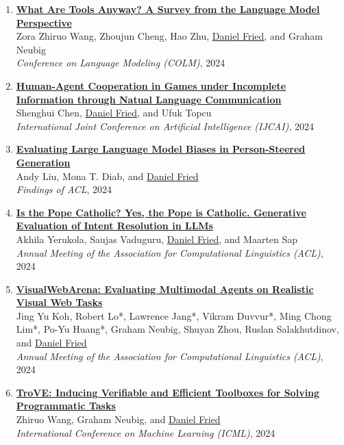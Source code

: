 \begin{enumerate}[leftmargin=-1mm,partopsep=0pt]
\item \href{http://arxiv.org/abs/2403.15452}{\textbf{What Are Tools Anyway? A Survey from the Language Model Perspective}} \\
  Zora Zhiruo Wang, Zhoujun Cheng, Hao Zhu, \underline{Daniel Fried}, and Graham Neubig\\
  \emph{Conference on Language Modeling (COLM)}, 2024

\item \href{https://arxiv.org/abs/2405.14173}{\textbf{Human-Agent Cooperation in Games under Incomplete Information through Natual Language Communication }} \\
  Shenghui Chen, \underline{Daniel Fried}, and Ufuk Topcu\\
  \emph{International Joint Conference on Artificial Intelligence (IJCAI)}, 2024

\item \href{https://arxiv.org/abs/2405.20253}{\textbf{Evaluating Large Language Model Biases in Person-Steered Generation}} \\
  Andy Liu, Mona T. Diab, and \underline{Daniel Fried}\\
  \emph{Findings of ACL}, 2024

\item \href{https://arxiv.org/abs/2405.08760}{\textbf{Is the Pope Catholic? Yes, the Pope is Catholic. Generative Evaluation of Intent Resolution in LLMs}} \\
  Akhila Yerukola, Saujas Vaduguru, \underline{Daniel Fried}, and Maarten Sap\\
  \emph{Annual Meeting of the Association for Computational Linguistics (ACL)}, 2024

\item \href{https://arxiv.org/abs/2401.13649}{\textbf{VisualWebArena: Evaluating Multimodal Agents on Realistic Visual Web Tasks}} \\
  Jing Yu Koh, Robert Lo*, Lawrence Jang*, Vikram Duvvur*, Ming Chong Lim*, Po-Yu Huang*, Graham Neubig, Shuyan Zhou, Ruslan Salakhutdinov, and \underline{Daniel Fried}\\
  \emph{Annual Meeting of the Association for Computational Linguistics (ACL)}, 2024

\item \href{https://arxiv.org/abs/2401.12869}{\textbf{TroVE: Inducing Verifiable and Efficient Toolboxes for Solving Programmatic Tasks}} \\
  Zhiruo Wang, Graham Neubig, and \underline{Daniel Fried}\\
  \emph{International Conference on Machine Learning (ICML)}, 2024


\end{enumerate}
